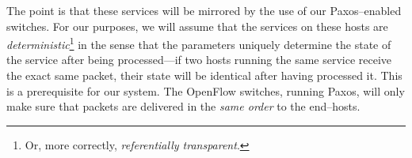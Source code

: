 The point is that these services will be mirrored by the use of our
Paxos--enabled switches.  For our purposes, we will assume that the services
on these hosts are \textit{deterministic}\footnote{Or, more correctly,
\textit{referentially transparent}.} in the sense that the parameters
uniquely determine the state of the service after being processed---if two
hosts running the same service receive the exact same packet, their state
will be identical after having processed it.  This is a prerequisite for our
system.  The OpenFlow switches, running Paxos, will only make sure that
packets are delivered in the \textit{same order} to the end--hosts.

